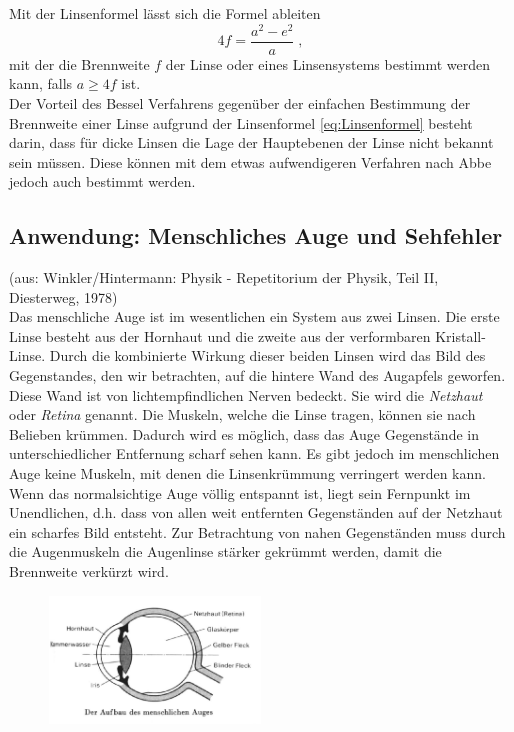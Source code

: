 \noindent
Mit der Linsenformel lässt sich die Formel ableiten
\begin{equation}
 4f = \frac{a^2 - e^2}{a}\; ,
\end{equation}
mit der die Brennweite $f$ der Linse oder eines Linsensystems bestimmt werden kann, falls $a \geq 4f$ ist.\\
Der Vorteil des Bessel Verfahrens gegenüber der einfachen Bestimmung der Brennweite einer Linse aufgrund der Linsenformel \ref{eq:Linsenformel} besteht darin, dass für dicke Linsen die Lage der Hauptebenen der Linse nicht bekannt sein müssen. Diese können mit dem etwas aufwendigeren Verfahren nach Abbe jedoch auch bestimmt werden.

\subsection{Anwendung: Menschliches Auge und Sehfehler}

(aus: Winkler/Hintermann: Physik - Repetitorium der Physik, Teil II, Diesterweg, 1978)\\

\noindent
Das menschliche Auge ist im wesentlichen ein System aus zwei Linsen. Die erste Linse besteht aus der Hornhaut und die zweite aus der verformbaren Kristall-Linse. Durch die kombinierte Wirkung dieser beiden Linsen wird das Bild des Gegenstandes, den wir betrachten, auf die hintere Wand des Augapfels geworfen. Diese Wand ist von lichtempfindlichen Nerven bedeckt. Sie wird die \textit{Netzhaut} oder \textit{Retina} genannt. Die Muskeln, welche die Linse tragen, können sie nach Belieben krümmen. Dadurch wird es möglich, dass das Auge Gegenstände in unterschiedlicher Entfernung scharf sehen kann. Es gibt jedoch im menschlichen Auge keine Muskeln, mit denen die Linsenkrümmung verringert werden kann. Wenn das normalsichtige Auge völlig entspannt ist, liegt sein Fernpunkt im Unendlichen, d.h. dass von allen weit entfernten Gegenständen auf der Netzhaut ein scharfes Bild entsteht. Zur Betrachtung von nahen Gegenständen muss durch die Augenmuskeln die Augenlinse stärker gekrümmt werden, damit die Brennweite verkürzt 
wird.
\begin{figure}[h]
	\centering
		\includegraphics[width=0.5\textwidth]{Versuch_7-8/Abbildungen/auge.jpg}
	\label{fig:auge}
\end{figure}


